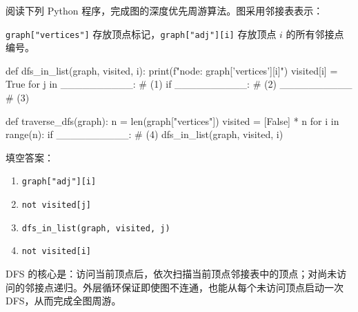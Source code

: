 \begin{question}[深度优先周游]
阅读下列 Python 程序，完成图的深度优先周游算法。图采用邻接表表示：\par
\texttt{graph["vertices"]} 存放顶点标记，\texttt{graph["adj"][i]} 存放顶点 $i$ 的所有邻接点编号。

\begin{pycode}
def dfs_in_list(graph, visited, i):
    print(f"node: {graph['vertices'][i]}")
    visited[i] = True
    for j in __________:                       # (1)
        if __________:                         # (2)
            __________                         # (3)


def traverse_dfs(graph):
    n = len(graph["vertices"])
    visited = [False] * n
    for i in range(n):
        if __________:                         # (4)
            dfs_in_list(graph, visited, i)
\end{pycode}

\begin{solution}
填空答案：
\begin{enumerate}
  \item \texttt{graph["adj"][i]}
  \item \texttt{not visited[j]}
  \item \texttt{dfs\_in\_list(graph, visited, j)}
  \item \texttt{not visited[i]}
\end{enumerate}
DFS 的核心是：访问当前顶点后，依次扫描当前顶点邻接表中的顶点；对尚未访问的邻接点递归。外层循环保证即使图不连通，也能从每个未访问顶点启动一次 DFS，从而完成全图周游。
\end{solution}
\end{question}



